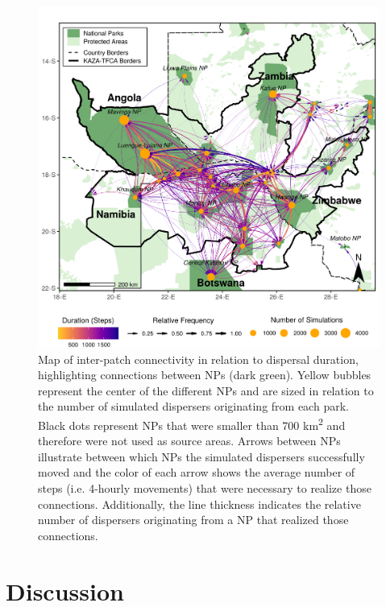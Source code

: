 \documentclass[../FinalThesis.tex]{subfiles}
\begin{document}
\begin{figure}[htpb]
  \includegraphics[width=\textwidth]{Figures/InterpatchConnectivity.png}
  \caption{Map of inter-patch connectivity in relation to dispersal duration,
  highlighting connections between NPs (dark green). Yellow bubbles represent
  the center of the different NPs and are sized in relation to the number of
  simulated dispersers originating from each park. Black dots represent NPs that
  were smaller than 700 km\textsuperscript{2} and therefore were not used as
  source areas. Arrows between NPs illustrate between which NPs the simulated
  dispersers successfully moved and the color of each arrow shows the average
  number of steps (i.e. 4-hourly movements) that were necessary to realize those
  connections. Additionally, the line thickness indicates the relative number of
  dispersers originating from a NP that realized those connections.}
  \label{InterpatchConnectivity}
\end{figure}

\section{Discussion}
\end{document}
